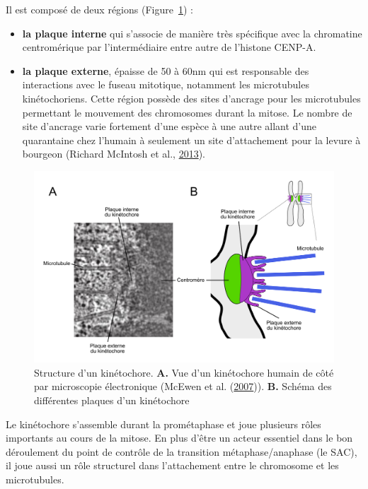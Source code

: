 \documentclass[12pt,a4paper,twoside,openright]{book}
\begin{document}
Il est composé de deux régions (Figure~\ref{fig:kt}) :

\begin{itemize}
\item
  \textbf{la plaque interne} qui s'associe de manière très spécifique
  avec la chromatine centromérique par l'intermédiaire entre autre de
  l'histone CENP-A.
\item
  \textbf{la plaque externe}, épaisse de 50 à 60nm qui est responsable
  des interactions avec le fuseau mitotique, notamment les microtubules
  kinétochoriens. Cette région possède des sites d'ancrage pour les
  microtubules permettant le mouvement des chromosomes durant la mitose.
  Le nombre de site d'ancrage varie fortement d'une espèce à une autre
  allant d'une quarantaine chez l'humain à seulement un site
  d'attachement pour la levure à bourgeon (Richard McIntosh et al.,
  \protect\hyperlink{ref-Mcintosh2013}{2013}).
\end{itemize}

\begin{figure}[htbp]
\centering
\includegraphics{figures/intro/kt.png}
\caption[Structure d'un kinétochore]{\label{fig:kt}Structure d'un
kinétochore. \textbf{A.} Vue d'un kinétochore humain de côté par
microscopie électronique (McEwen et al.
(\protect\hyperlink{ref-McEwen2007}{2007})). \textbf{B.} Schéma des
différentes plaques d'un kinétochore}
\end{figure}

Le kinétochore s'assemble durant la prométaphase et joue plusieurs rôles
importants au cours de la mitose. En plus d'être un acteur essentiel
dans le bon déroulement du point de contrôle de la transition
métaphase/anaphase (le SAC), il joue aussi un rôle structurel dans
l'attachement entre le chromosome et les microtubules.
\end{document}
